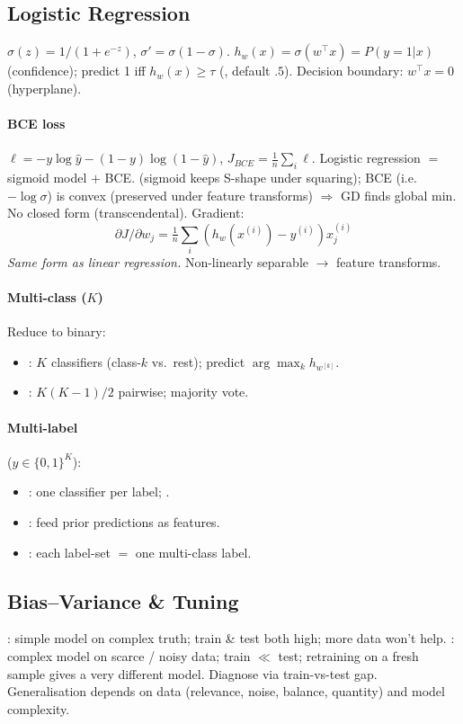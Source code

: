 \subsection{Logistic Regression}
 $\sigma(z){=}1/(1{+}e^{-z})$, $\sigma'{=}\sigma(1{-}\sigma)$.  $h_w(x){=}\sigma(w^{\top}x){=}P(y{=}1|x)$ (confidence); predict 1 iff $h_w(x){\geq}\tau$ (, default $.5$). Decision boundary: $w^{\top}x{=}0$ (hyperplane).
\paragraph{BCE loss} $\ell{=}{-}y\log\hat y-(1{-}y)\log(1{-}\hat y)$, $J_{BCE}{=}\tfrac1n\sum_i\ell$. Logistic regression $=$ sigmoid model $+$ BCE.  (sigmoid keeps S-shape under squaring); BCE (i.e.\ $-\log\sigma$) is convex (preserved under feature transforms) $\Rightarrow$ GD finds global min. No closed form (transcendental). Gradient:
\[\partial J/\partial w_j=\tfrac1n\sum_i(h_w(x^{(i)})-y^{(i)})x^{(i)}_j\]
\emph{Same form as linear regression.} Non-linearly separable $\to$ feature transforms.
\paragraph{Multi-class ($K$)} Reduce to binary:
\begin{itemize}
\item {}: $K$ classifiers (class-$k$ vs.\ rest); predict $\arg\max_k h_{w^{[k]}}$.
\item {}: $K(K{-}1)/2$ pairwise; majority vote.
\end{itemize}
\paragraph{Multi-label} ($y\!\in\!\{0,1\}^K$):
\begin{itemize}
\item {}: one classifier per label; .
\item {}: feed prior predictions as features.
\item {}: each label-set $=$ one multi-class label.
\end{itemize}

\subsection{Bias--Variance \& Tuning}
: simple model on complex truth; train \& test both high; more data won't help. : complex model on scarce / noisy data; train $\ll$ test; retraining on a fresh sample gives a very different model. Diagnose via train-vs-test gap. Generalisation depends on data (relevance, noise, balance, quantity) and model complexity.
